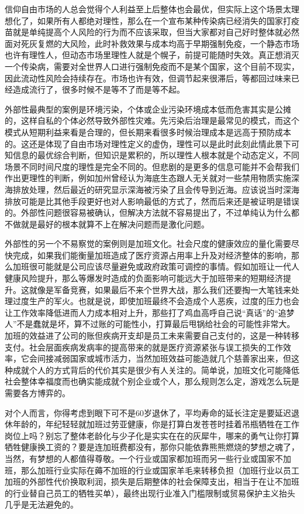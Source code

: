 \documentclass[]{book}
\begin{document}
信仰自由市场的人总会觉得个人利益至上后整体也会最优，但实际上这个场景太理想化了，如果所有人都绝对理性，那么在一个宣布某种传染病已经消失的国家打疫苗就是单纯提高个人风险的行为而不应该采取，但当大家都对自己好时整体就必然面对死灰复燃的大风险，此时补救效果与成本均高于早期强制免疫，一个静态市场也许有理性人，但动态市场里理性人就是个幌子，前提可能随时失效。真正想消灭一个传染病，需要对全世界人口进行强制免疫而不是某个国家，这个目前不现实，因此流动性风险会持续存在。市场也许有效，但调节起来很滞后，等都回过味来已经造成流行了，很多时候不是等不了而是等不起。

外部性最典型的案例是环境污染，个体或企业污染环境成本低而危害其实是公摊的，这样自私的个体必然导致外部性灾难。先污染后治理是最常见的模式，而这个模式从短期利益来看是合理的，但长期来看很多时候治理成本是远高于预防成本的。这还是体现了自由市场对理性定义的虚伪，理性可以是此时此刻此情此景下可知信息的最优综合判断，但知识是累积的，所以理性人根本就是个动态定义，不同场景不同时间尺度的理性是完全不同的。但悲剧的是更多的信息可能并不会帮我们作出更理性的判断，例如加州曾经认为海底生态跟人无关就对一些禁用物质实施深海排放处理，然后最近的研究显示深海被污染了且会传导到近海。应该说当时深海排放可能是比其他手段更好也对人影响最低的方式了，然而后来还是被证明是错误的。外部性问题很容易被确认，但解决方法就不容易提出了，不过单纯认为什么都不做就是最好的根本就算不上在解决问题而是激化问题。

外部性的另一个不易察觉的案例则是加班文化。社会尺度的健康效应的量化需要尽快完成，如果我们能衡量加班造成了医疗资源占用率上升及对经济整体的影响，那么加班很可能就是公司应该尽量避免或政府政策可调控的事情。假如加班让一代人健康风险提升，那么等爆发时造成的负面影响可能远大于加班带来的短期经济提升。这就像是军备竞赛，如果最后不来个世界大战，那么我们还要掏一大笔钱来处理过度生产的军火。也就是说，即使加班最终不会造成个人恶疾，过度的压力也会让工作效率降低进而人力成本相对上升，那些打了鸡血高呼自己说``真话''的``追梦人''不是蠢就是坏，算不过账的可能性小，打算最后甩锅给社会的可能性非常大。加班的效益进了公司的账但疾病开支却是员工未来需要自己支付的，这是一种转移支付。社会层面疾病发病率的提高带来的就是医疗资源紧张与误工损失的工作效率，它会间接减弱国家或城市活力，当然加班效益可能造就几个慈善家出来，但这种成就个人的方式背后的代价其实是很少有人关注的。简单说，加班文化可能降低社会整体幸福度而也确实能成就个别企业或个人，那么规则怎么定，游戏怎么玩是需要各方博弈的。

对个人而言，你得考虑到眼下可不是60岁退休了，平均寿命的延长注定是要延迟退休年龄的，年纪轻轻就加班过劳亚健康，你是打算白发苍苍时挂着吊瓶牺牲在工作岗位上吗？别忘了整体老龄化与少子化是实实在在的灰犀牛，哪来的勇气让你打算牺牲健康换工资的？要是连加班费都没有，那你只能依靠熊熊燃烧的梦想之魂了，当然，有梦想的人都值得尊敬。一个行业或国家都加班而另一些行业或国家不加班，那么加班行业实际在薅不加班的行业或国家羊毛来转移负担（加班行业以员工加班的外部性代价换取利润，损失是后期整体的社会保障支出，相当于在让不加班的行业替自己员工的牺牲买单），最终出现行业准入门槛限制或贸易保护主义抬头几乎是无法避免的。
\end{document}
